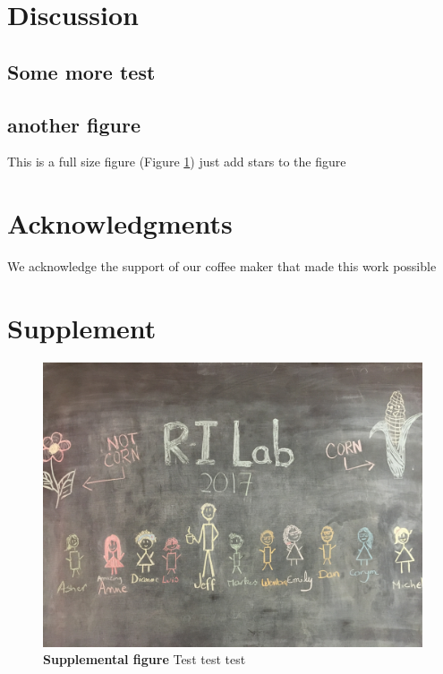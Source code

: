 \documentclass[article,9pt,twocolumn,twoside]{rilabRxiv}
\newcommand{\beginsupplement}{%
        \setcounter{table}{0}
        \renewcommand{\thetable}{S\arabic{table}}%
        \setcounter{figure}{0}
        \renewcommand{\thefigure}{S\arabic{figure}}%
     }
\begin{document}
\blindtext

\blindtext
\blindtext
\blindtext
\blindtext
\section{Discussion}
\subsection{Some more test}
\blindtext
\blindtext


\subsection{another figure}
This is a full size figure (Figure \ref{fig:S1}) just add stars to the figure


\section{Acknowledgments}
We acknowledge the support of our coffee maker that made this work possible



\onecolumn
\section*{Supplement}



\beginsupplement


\blindtext
\begin{figure}[h!]
\includegraphics[width=.9\linewidth]{figures/lab_group.png}
\caption{\textbf{Supplemental figure} Test test test}
\label{fig:S1}
\end{figure}
\pagebreak
\end{document}
